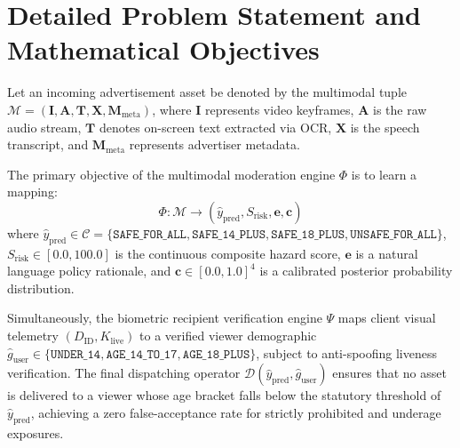 \documentclass[12pt,a4paper]{report}
\begin{document}
\section{Detailed Problem Statement and Mathematical Objectives}
Let an incoming advertisement asset be denoted by the multimodal tuple $\mathcal{M} = (\mathbf{I}, \mathbf{A}, \mathbf{T}, \mathbf{X}, \mathbf{M}_{\text{meta}})$, where $\mathbf{I}$ represents video keyframes, $\mathbf{A}$ is the raw audio stream, $\mathbf{T}$ denotes on-screen text extracted via OCR, $\mathbf{X}$ is the speech transcript, and $\mathbf{M}_{\text{meta}}$ represents advertiser metadata.

The primary objective of the multimodal moderation engine $\Phi$ is to learn a mapping:
\begin{equation}
\Phi: \mathcal{M} \longrightarrow \left( \hat{y}_{\text{pred}}, S_{\text{risk}}, \mathbf{e}, \mathbf{c} \right)
\end{equation}
where $\hat{y}_{\text{pred}} \in \mathcal{C} = \{\texttt{SAFE\_FOR\_ALL}, \texttt{SAFE\_14\_PLUS}, \texttt{SAFE\_18\_PLUS}, \texttt{UNSAFE\_FOR\_ALL}\}$, $S_{\text{risk}} \in [0.0, 100.0]$ is the continuous composite hazard score, $\mathbf{e}$ is a natural language policy rationale, and $\mathbf{c} \in [0.0, 1.0]^4$ is a calibrated posterior probability distribution.

Simultaneously, the biometric recipient verification engine $\Psi$ maps client visual telemetry $(D_{\text{ID}}, K_{\text{live}})$ to a verified viewer demographic $\hat{g}_{\text{user}} \in \{\texttt{UNDER\_14}, \texttt{AGE\_14\_TO\_17}, \texttt{AGE\_18\_PLUS}\}$, subject to anti-spoofing liveness verification. The final dispatching operator $\mathcal{D}(\hat{y}_{\text{pred}}, \hat{g}_{\text{user}})$ ensures that no asset is delivered to a viewer whose age bracket falls below the statutory threshold of $\hat{y}_{\text{pred}}$, achieving a zero false-acceptance rate for strictly prohibited and underage exposures.
\end{document}
